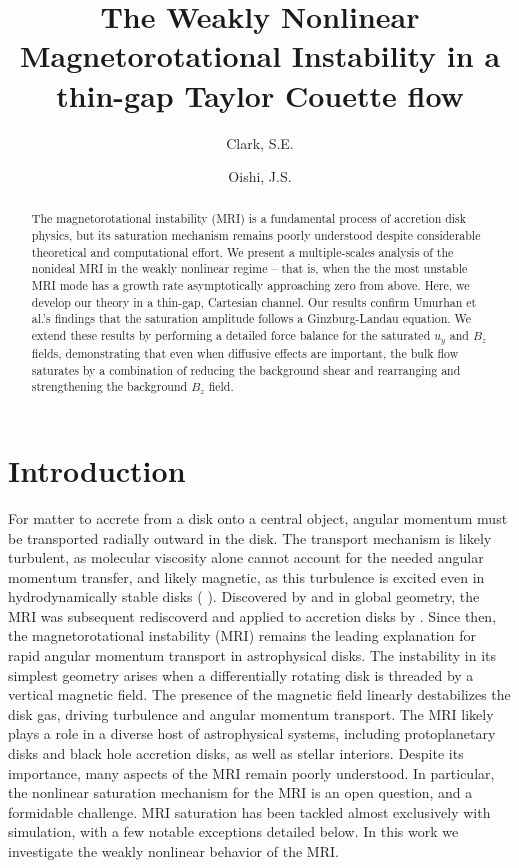 \documentclass{emulateapj}
\newcommand{\citei}[1]{\citeauthor{#1} \citeyear{#1}}
\begin{document}
\title{The Weakly Nonlinear Magnetorotational Instability in a thin-gap Taylor Couette flow}
\author{Clark, S.E.}
\author{Oishi, J.S. }



\begin{abstract}
The magnetorotational instability (MRI) is a fundamental process of accretion disk physics, but its saturation mechanism remains poorly understood despite considerable theoretical and computational effort. We present a multiple-scales analysis of the nonideal MRI in the weakly nonlinear regime -- that is, when the the most unstable MRI mode has a growth rate asymptotically approaching zero from above. Here, we develop our theory in a thin-gap, Cartesian channel. Our results confirm Umurhan et al.'s findings that the saturation amplitude follows a Ginzburg-Landau equation. We extend these results by performing a detailed force balance for the saturated $u_y$ and $B_z$ fields, demonstrating that even when diffusive effects are important, the bulk flow saturates by a combination of reducing the background shear and rearranging and strengthening the background $B_z$ field. 
\end{abstract}

\section{Introduction}

For matter to accrete from a disk onto a central object, angular momentum must be transported radially outward in the disk. The transport mechanism is likely turbulent, as molecular viscosity alone cannot account for the needed angular momentum transfer, and likely magnetic, as this turbulence is excited even in hydrodynamically stable disks (\citei{Shakura:1973wg}).  Discovered by \citet{Chandrasekhar:1960wh} and \citet{Velikhov:1959} in global geometry, the MRI was subsequent rediscoverd and applied to accretion disks by \citet{Balbus:1991vs}. Since then, the magnetorotational instability (MRI) remains the leading explanation for rapid angular momentum transport in astrophysical disks. The instability in its simplest geometry arises when a differentially rotating disk is threaded by a vertical magnetic field. The presence of the magnetic field linearly destabilizes the disk gas, driving turbulence and angular momentum transport. The MRI likely plays a role in a diverse host of astrophysical systems, including protoplanetary disks and black hole accretion disks, as well as stellar interiors. Despite its importance, many aspects of the MRI remain poorly understood. In particular, the nonlinear saturation mechanism for the MRI is an open question, and a formidable challenge. MRI saturation has been tackled almost exclusively with simulation, with a few notable exceptions detailed below. In this work we investigate the weakly nonlinear behavior of the MRI.
\end{document}
